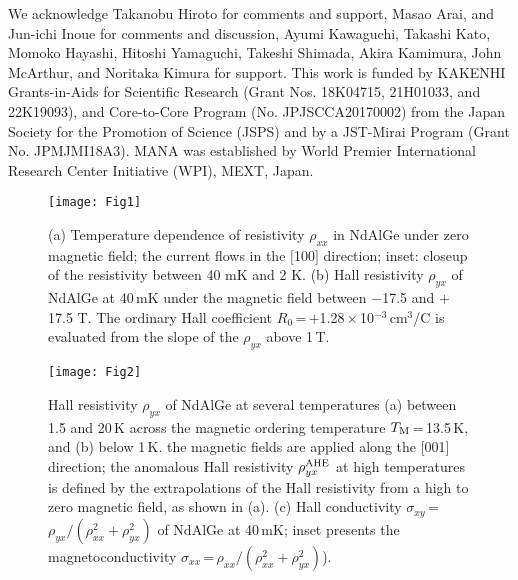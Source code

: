 \documentclass[%
preprint,
 amsmath,amssymb,
 aps,
]{revtex4-2}
\begin{document}
\begin{acknowledgments}

%
We acknowledge Takanobu Hiroto for comments and support, Masao Arai, and Jun-ichi Inoue 
for comments and discussion, Ayumi Kawaguchi, Takashi Kato, Momoko Hayashi, 
Hitoshi Yamaguchi, Takeshi Shimada, Akira Kamimura, John McArthur, and Noritaka Kimura for support. 
%
This work is funded by KAKENHI Grants-in-Aids for Scientific Research 
(Grant Nos. 18K04715, 21H01033, and 22K19093), 
and Core-to-Core Program (No. JPJSCCA20170002) 
from the Japan Society for the Promotion of Science (JSPS) and 
by a JST-Mirai Program (Grant No. JPMJMI18A3). 
%
MANA was established by World Premier International Research Center Initiative (WPI), MEXT, Japan. 
%

\end{acknowledgments}


\clearpage

\begin{figure}
\texttt{[image: Fig1]}%
\caption{
(a) Temperature dependence of resistivity $\rho_{xx}$ in NdAlGe under zero magnetic field; 
the current flows in the $\lbrack$100$\rbrack$ direction; inset: closeup of the resistivity 
between 40 mK and 2 K. 
(b) Hall resistivity $\rho_{yx}$ of NdAlGe at 40\,mK under the magnetic field 
between $-$17.5 and $+$17.5 T. 
The ordinary Hall coefficient $R_{0}$\,=\,$+$1.28\,$\times$\,10$^{-3}$\,cm$^{3}$/C 
is evaluated from the slope of the $\rho_{yx}$ above 1\,T. 
}
\end{figure}

\begin{figure*}
\texttt{[image: Fig2]}%
\caption{
Hall resistivity $\rho_{yx}$ of NdAlGe at several temperatures 
(a) between 1.5 and 20\,K across the magnetic ordering temperature $T_{\rm M}$\,=\,13.5\,K, 
and (b) below 1\,K. 
the magnetic fields are applied along the $\lbrack$001$\rbrack$ direction; 
the anomalous Hall resistivity $\rho_{yx}^{\rm AHE}$ at high temperatures is defined 
by the extrapolations of the Hall resistivity from a high to zero magnetic field, 
as shown in (a). 
(c) Hall conductivity $\sigma_{xy}$\,=\,$\rho_{yx}/(\rho_{xx}^2 +\rho_{yx}^2)$ of NdAlGe at 40\,mK; 
inset presents the magnetoconductivity $\sigma_{xx}$\,=\,$\rho_{xx}/(\rho_{xx}^2 +\rho_{yx}^2)$).
}
\end{figure*}
\end{document}
